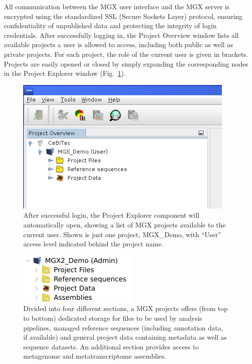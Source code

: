 All communication between the MGX user interface and the MGX server is encrypted using
the standardized SSL (Secure Sockets Layer) protocol, ensuring confidentiality of 
unpublished data and protecting the integrity of login credentials.
After successfully logging in, the Project Overview window
lists all available projects a user is allowed to access, including both public as well as
private projects. For each project, the role of the current user is given in brackets.
Projects are easily opened or closed by simply expanding the corresponding
nodes in the Project Explorer window (Fig.~\ref{projects}).\\

\begin{figure}[H]
\centering
\includegraphics[width=.8\textwidth]{img/mgx/projects}
\caption[Project Explorer]{After successful login, the Project Explorer component will automatically open,
showing a list of MGX projects available to the current user. Shown is just one project, MGX\_Demo, with
``User'' access level indicated behind the project name.}
\label{projects}
\end{figure}

\begin{figure}[H]
\centering
\includegraphics[width=.4\textwidth]{img/mgx/projstructure}
\caption[Project structure]{Divided into four different sections, a MGX projects offers
(from top to bottom) dedicated storage for files to be used by analysis pipelines, 
managed reference sequences (including annotation data, if available) and general
project data containing metadata as well as sequence datasets. An additional section
provides access to metagenome and metatranscriptome assemblies.}
\label{structure}
\end{figure}

